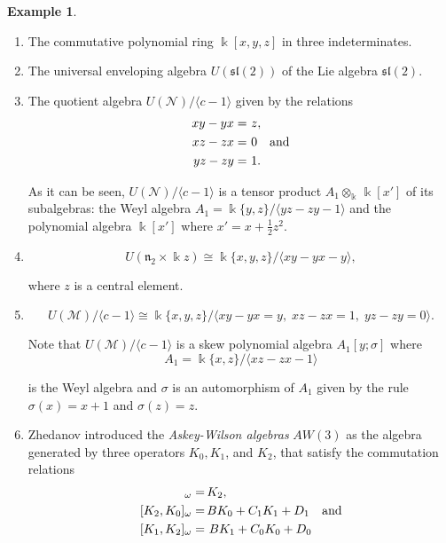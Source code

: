 \documentclass{amsart}
\theoremstyle{definition}
\newtheorem{example}[theorem]{Example}
\theoremstyle{remark}
\numberwithin{equation}{section}
\begin{document}
\begin{example}
\begin{enumerate}
\item [\rm (i)] The commutative polynomial ring $\Bbbk[x, y, z]$ in three indeterminates.

\item [\rm (ii)] The universal enveloping algebra $U(\mathfrak{sl}(2))$ of the Lie algebra $\mathfrak{sl}(2)$.

\item [\rm (iii)] The quotient algebra $U(\mathcal{N}) / \langle c - 1\rangle$ given by the relations
\begin{align*}
xy - yx = &\ z, \\
xz - zx = &\ 0 \quad {\rm and} \\
yz - zy = &\ 1.
\end{align*}

As it can be seen, $U(\mathcal{N}) / \langle c - 1\rangle$ is a tensor product $A_1 \otimes_{\Bbbk} \, \Bbbk[x']$ of its subalgebras: the Weyl algebra $A_1 = \Bbbk \{y, z\} / \langle yz - zy - 1\rangle$ and the polynomial algebra $\Bbbk[x']$ where $x' = x + \frac{1}{2}z^2$.

\item [\rm (iv)] 
$$
U(\mathfrak{n}_2 \times \Bbbk z) \cong \Bbbk \{x, y, z\} / \langle xy - yx - y\rangle, 
$$ 

where $z$ is a central element.

\item [\rm (v)] 
$$
U(\mathcal{M})/\langle c-1\rangle \cong \Bbbk\{x,y,z\} / \langle xy - yx = y, \; xz - zx = 1,\; yz - zy = 0 \rangle.
$$ 

Note that $U(\mathcal{M})/\langle c-1\rangle$ is a skew polynomial algebra $A_1[y;\sigma]$ where
$$
A_1 = \Bbbk\{x, z\} / \langle xz - zx - 1\rangle
$$

is the Weyl algebra and $\sigma$ is an automorphism of $A_1$ given by the rule $\sigma(x) = x + 1$ and $\sigma(z) = z$.

\item [\rm (vi)] Zhedanov \cite[Section 1]{Zhedanov1991} introduced the {\em Askey-Wilson algebras} $AW(3)$ as the algebra generated by three operators $K_0, K_1$, and $K_2$, that satisfy the commutation relations 
\begin{align*}
[K_0, K_1]_{\omega} = &\, K_2, \\    
[K_2, K_0]_{\omega} = &\, BK_0 + C_1K_1 + D_1 \quad {\rm and} \\
[K_1, K_2]_{\omega} = &\ BK_1 + C_0K_0 + D_0
\end{align*}


\end{enumerate}
\end{example}
\end{document}
